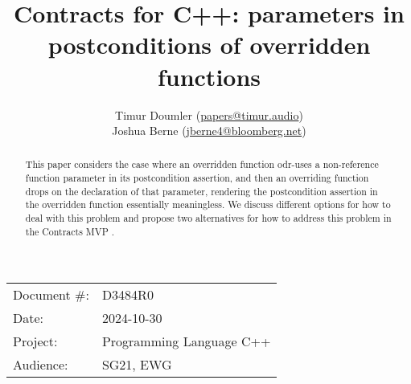 

 \usepackage[bottom]{footmisc} 

 \usepackage{longtable}


\usepackage{tikz,lipsum,lmodern}
\usepackage[most]{tcolorbox}



\usepackage{titlesec}
\usepackage{tocloft}


\newcommand{\changelocaltocdepth}[1]{%
  \addtocontents{toc}{\protect\setcounter{tocdepth}{#1}}%
  \setcounter{tocdepth}{#1}%
}

\setcounter{tocdepth}{3}



\title{Contracts for C++:  parameters in\\ postconditions of overridden functions}
\author{
Timur Doumler \small(\href{mailto:papers@timur.audio}{papers@timur.audio}) \\
Joshua Berne \small(\href{mailto:jberne4@bloomberg.net}{jberne4@bloomberg.net}) \\
}
\date{}
\maketitle

\begin{tabular}{ll}
Document \#: & D3484R0 \\
Date: &2024-10-30 \\
Project: & Programming Language C++ \\
Audience: & SG21, EWG
\end{tabular}

\begin{abstract}
This paper considers the case where an overridden function odr-uses a non-reference function parameter in its postcondition assertion, and then an overriding function drops  on the declaration of that parameter, rendering the postcondition assertion in the overridden function essentially meaningless. We discuss different options for how to deal with this problem and propose two alternatives for how to address this problem in the Contracts MVP \cite{P2900R10}.
\end{abstract}

